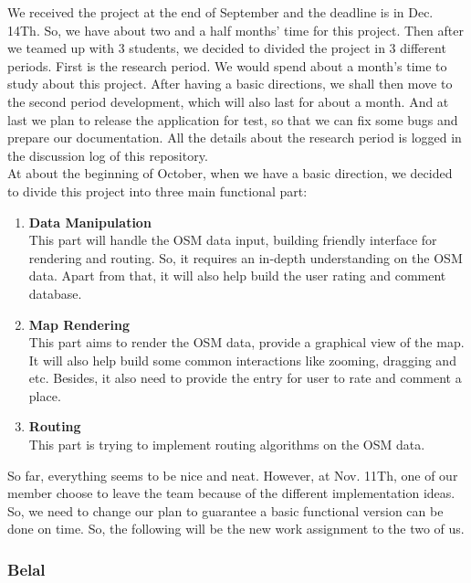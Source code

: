 \documentclass[a4paper, 12pt, english]{book}
\begin{document}
We received the project at the end of September and the deadline is in Dec. 14Th. So, we have about two and a half months' time for this project. Then after we teamed up with 3 students, we decided to divided the project in 3 different periods. First is the research period. We would spend about a month's time to study about this project. After having a basic directions, we shall then move to the second period development, which will also last for about a month. And at last we plan to release the application for test, so that we can fix some bugs and prepare our documentation. All the details about the research period is logged in the discussion log of this repository. \\
At about the beginning of October, when we have a basic direction, we decided to divide this project into three main functional part: 
\begin{enumerate}
	\item {\textbf{Data Manipulation}}\\
	
	This part will handle the OSM data input, building friendly interface for rendering and routing. So, it requires an in-depth understanding on the OSM data. Apart from that, it will also help build the user rating and comment database.
	\item {\textbf{Map Rendering}}\\
	
	This part aims to render the OSM data, provide a graphical view of the map. It will also help build some common interactions like zooming, dragging and etc. Besides, it also need to provide the entry for user to rate and comment a place.
	\item {\textbf{Routing}}\\
	
	This part is trying to implement routing algorithms on the OSM data.
\end{enumerate}

So far, everything seems to be nice and neat. However, at Nov. 11Th, one of our member choose to leave the team because of the different implementation ideas. So, we need to change our plan to guarantee a basic functional version can be done on time. So, the following will be the new work assignment to the two of us.

\subsubsection{Belal}
\end{document}
